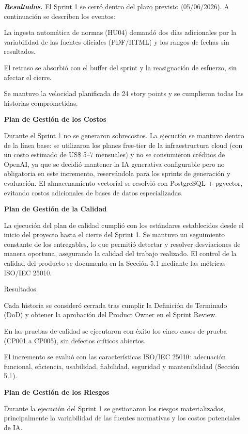 \documentclass[12pt,a4paper,oneside]{report}
\begin{document}
\emph{\textbf{Resultados.}} El Sprint 1 se cerró dentro del plazo
previsto (05/06/2026). A continuación se describen los eventos:

La ingesta automática de normas (HU04) demandó dos días adicionales por
la variabilidad de las fuentes oficiales (PDF/HTML) y los rangos de
fechas sin resultados.

El retraso se absorbió con el buffer del sprint y la reasignación de
esfuerzo, sin afectar el cierre.

Se mantuvo la velocidad planificada de 24 story points y se cumplieron
todas las historias comprometidas.

\textbf{Plan de Gestión de los Costos}

Durante el Sprint 1 no se generaron sobrecostos. La ejecución se mantuvo
dentro de la línea base: se utilizaron los planes free-tier de la
infraestructura cloud (con un costo estimado de US\$ 5--7 mensuales) y
no se consumieron créditos de OpenAI, ya que se decidió mantener la IA
generativa configurable pero no obligatoria en este incremento,
reservándola para los sprints de generación y evaluación. El
almacenamiento vectorial se resolvió con PostgreSQL + pgvector, evitando
costos adicionales de bases de datos especializadas.

\textbf{Plan de Gestión de la Calidad}

La ejecución del plan de calidad cumplió con los estándares establecidos
desde el inicio del proyecto hasta el cierre del Sprint 1. Se mantuvo un
seguimiento constante de los entregables, lo que permitió detectar y
resolver desviaciones de manera oportuna, asegurando la calidad del
trabajo realizado. El control de la calidad del producto se documenta en
la Sección 5.1 mediante las métricas ISO/IEC 25010.

Resultados.

Cada historia se consideró cerrada tras cumplir la Definición de
Terminado (DoD) y obtener la aprobación del Product Owner en el Sprint
Review.

En las pruebas de calidad se ejecutaron con éxito los cinco casos de
prueba (CP001 a CP005), sin defectos críticos abiertos.

El incremento se evaluó con las características ISO/IEC 25010:
adecuación funcional, eficiencia, usabilidad, fiabilidad, seguridad y
mantenibilidad (Sección 5.1).

\textbf{Plan de Gestión de los Riesgos}

Durante la ejecución del Sprint 1 se gestionaron los riesgos
materializados, principalmente la variabilidad de las fuentes normativas
y los costos potenciales de IA.
\end{document}

